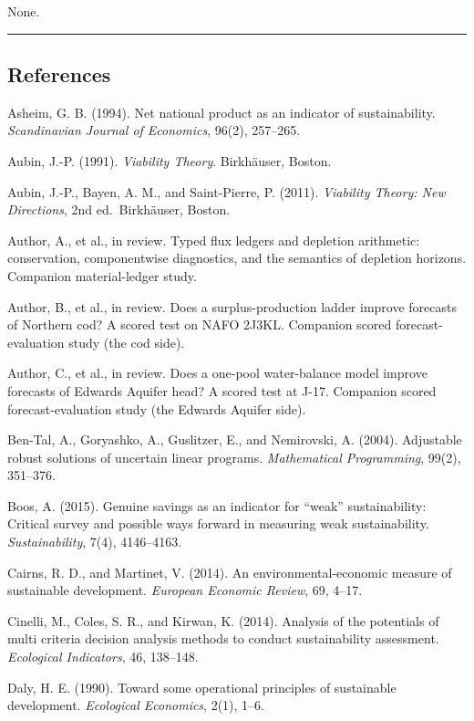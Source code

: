 \documentclass[11pt]{article}
\begin{document}
None.

\begin{center}\rule{0.5\linewidth}{0.5pt}\end{center}

\subsection{References}\label{references}

Asheim, G. B. (1994). Net national product as an indicator of
sustainability. \emph{Scandinavian Journal of Economics}, 96(2),
257--265.

Aubin, J.-P. (1991). \emph{Viability Theory}. Birkh\"auser, Boston.

Aubin, J.-P., Bayen, A. M., and Saint-Pierre, P. (2011). \emph{Viability
Theory: New Directions}, 2nd ed.~Birkh\"auser, Boston.

Author, A., et al., in review. Typed flux ledgers and depletion
arithmetic: conservation, componentwise diagnostics, and the semantics
of depletion horizons. Companion material-ledger study.

Author, B., et al., in review. Does a surplus-production ladder improve
forecasts of Northern cod? A scored test on NAFO 2J3KL. Companion scored
forecast-evaluation study (the cod side).

Author, C., et al., in review. Does a one-pool water-balance model
improve forecasts of Edwards Aquifer head? A scored test at J-17.
Companion scored forecast-evaluation study (the Edwards Aquifer side).

Ben-Tal, A., Goryashko, A., Guslitzer, E., and Nemirovski, A. (2004).
Adjustable robust solutions of uncertain linear programs.
\emph{Mathematical Programming}, 99(2), 351--376.

Boos, A. (2015). Genuine savings as an indicator for ``weak''
sustainability: Critical survey and possible ways forward in measuring
weak sustainability. \emph{Sustainability}, 7(4), 4146--4163.

Cairns, R. D., and Martinet, V. (2014). An environmental-economic
measure of sustainable development. \emph{European Economic Review}, 69,
4--17.

Cinelli, M., Coles, S. R., and Kirwan, K. (2014). Analysis of the
potentials of multi criteria decision analysis methods to conduct
sustainability assessment. \emph{Ecological Indicators}, 46, 138--148.

Daly, H. E. (1990). Toward some operational principles of sustainable
development. \emph{Ecological Economics}, 2(1), 1--6.
\end{document}
